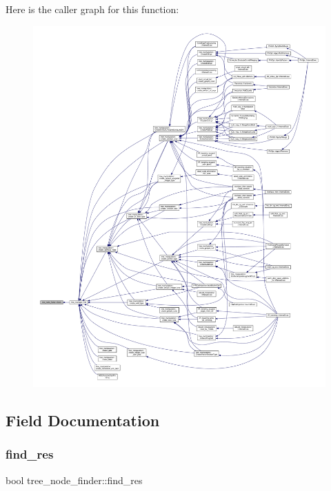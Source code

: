 Here is the caller graph for this function\+:
\nopagebreak
\begin{figure}[H]
\begin{center}
\leavevmode
\includegraphics[width=350pt]{da/dcb/structtree__node__finder_ac06e16fcd94b5b20a811f72e87e48579_icgraph}
\end{center}
\end{figure}


\subsection{Field Documentation}
\mbox{\label{structtree__node__finder_a774eb82d34641de3b0b6b0ab800bc9f9}} 
\subsubsection{\texorpdfstring{find\+\_\+res}{find\_res}}
{\footnotesize\ttfamily bool tree\+\_\+node\+\_\+finder\+::find\+\_\+res\hspace{0.3cm}{\ttfamily [private]}}




